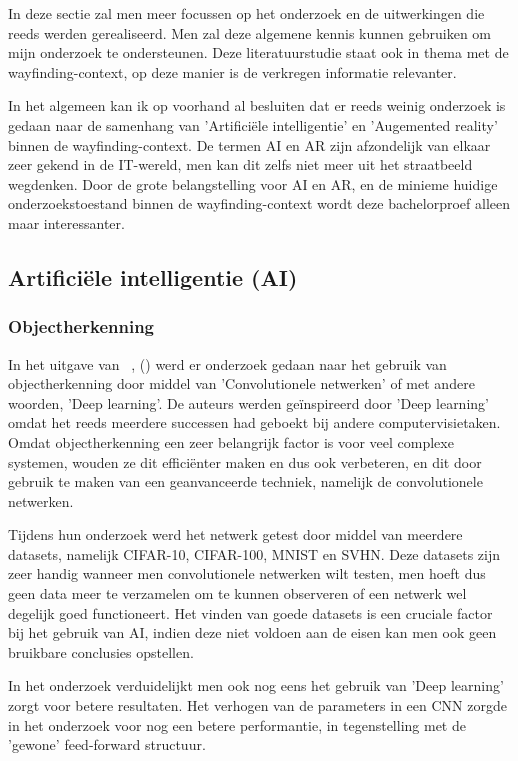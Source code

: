 In deze sectie zal men meer focussen op het onderzoek en de uitwerkingen die reeds werden gerealiseerd. Men zal deze algemene kennis kunnen gebruiken om mijn onderzoek te ondersteunen. Deze literatuurstudie staat ook in thema met de wayfinding-context, op deze manier is de verkregen informatie relevanter.

In het algemeen kan ik op voorhand al besluiten dat er reeds weinig onderzoek is gedaan naar de samenhang van 'Artificiële intelligentie' en 'Augemented reality' binnen de wayfinding-context. De termen AI en AR zijn afzondelijk van elkaar zeer gekend in de IT-wereld, men kan dit zelfs niet meer uit het straatbeeld wegdenken. Door de grote belangstelling voor AI en AR, en de minieme huidige onderzoekstoestand binnen de wayfinding-context wordt deze bachelorproef alleen maar interessanter.

\subsection{Artificiële intelligentie (AI)}

\subsubsection{Objectherkenning}
In het uitgave van ~\textcite{Liang2015}, () werd er onderzoek gedaan naar het gebruik van objectherkenning door middel van 'Convolutionele netwerken' of met andere woorden, 'Deep learning'. De auteurs werden geïnspireerd door 'Deep learning' omdat het reeds meerdere successen had geboekt bij andere computervisietaken. Omdat objectherkenning een zeer belangrijk factor is voor veel complexe systemen, wouden ze dit efficiënter maken en dus ook verbeteren, en dit door gebruik te maken van een geanvanceerde techniek, namelijk de convolutionele netwerken. 

Tijdens hun onderzoek werd het netwerk getest door middel van meerdere datasets, namelijk CIFAR-10, CIFAR-100, MNIST en SVHN. Deze datasets zijn zeer handig wanneer men convolutionele netwerken wilt testen, men hoeft dus geen data meer te verzamelen om te kunnen observeren of een netwerk wel degelijk goed functioneert. Het vinden van goede datasets is een cruciale factor bij het gebruik van AI, indien deze niet voldoen aan de eisen kan men ook geen bruikbare conclusies opstellen.

In het onderzoek verduidelijkt men ook nog eens het gebruik van 'Deep learning' zorgt voor betere resultaten. Het verhogen van de parameters in een CNN zorgde in het onderzoek voor nog een betere performantie, in tegenstelling met de 'gewone' feed-forward structuur. 

